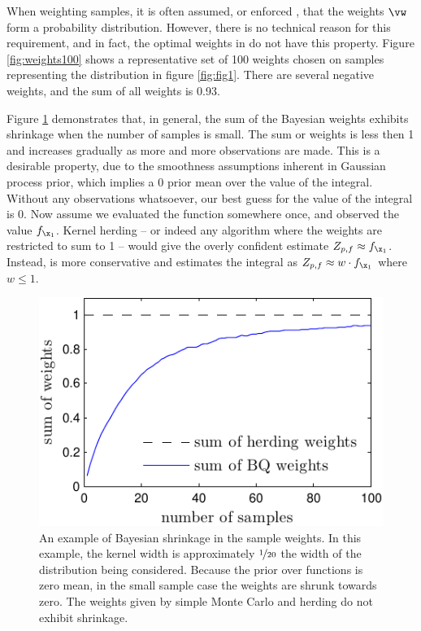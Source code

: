 When weighting samples, it is often assumed, or enforced \citep[as in][]{Bach2012,Song2008}, that the weights $\vw$ form a probability distribution. However, there is no technical reason for this requirement, and in fact, the optimal weights in \bq{} do not have this property. Figure \ref{fig:weights100} shows a representative set of 100 \bq{} weights chosen on samples representing the distribution in figure \ref{fig:fig1}. There are several negative weights, and the sum of all weights is 0.93.

Figure \ref{fig:weights_shrinkage} demonstrates that, in general, the sum of the Bayesian weights exhibits shrinkage when the number of samples is small. The sum or weights is less then 1 and increases gradually as more and more observations are made. This is a desirable property, due to the smoothness assumptions inherent in Gaussian process prior, which implies a $0$ prior mean over the value of the integral. Without any observations whatsoever, our best guess for the value of the integral is $0$. Now assume we evaluated the function somewhere once, and observed the value $f_{\x_1}$. Kernel herding -- or indeed any algorithm where the weights are restricted to sum to 1 -- would give the overly confident estimate $Z_{p,f} \approx f_{\x_1}$. Instead, \bq{} is more conservative and estimates the integral as $Z_{p,f} \approx w\cdot f_{\x_1}$ where $w \leq 1$.

\begin{figure}
	\centering
	\includegraphics[width=.8\columnwidth]{figs/herding/weights_shrinkage}
	
		\caption[The concept of shrinkage in Bayesian quadrature]{An example of Bayesian shrinkage in the sample weights. In this example, the kernel width is approximately $\nicefrac{1}{20}$ the width of the distribution being considered. Because the prior over functions is zero mean, in the small sample case the weights are shrunk towards zero. The weights given by simple Monte Carlo and herding do not exhibit shrinkage. }
	\label{fig:weights_shrinkage}
\end{figure}

